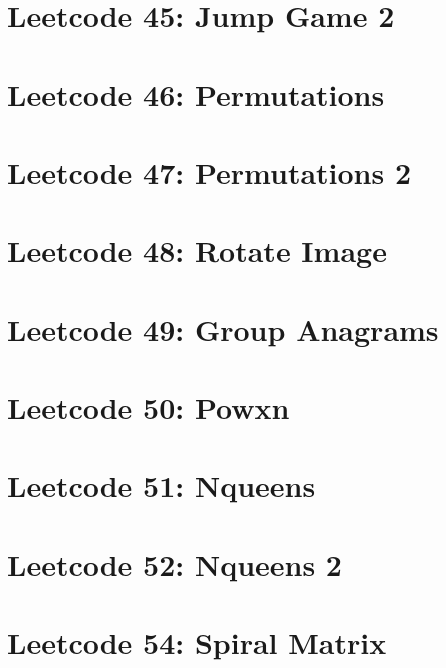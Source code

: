 \documentclass{article}
\begin{document}
\section*{Leetcode 45: Jump Game 2}

\pagebreak 

\section*{Leetcode 46: Permutations}

\pagebreak 

\section*{Leetcode 47: Permutations 2}

\pagebreak 

\section*{Leetcode 48: Rotate Image}

\pagebreak 

\section*{Leetcode 49: Group Anagrams}

\pagebreak 

\section*{Leetcode 50: Powxn}

\pagebreak 

\section*{Leetcode 51: Nqueens}

\pagebreak 

\section*{Leetcode 52: Nqueens 2}

\pagebreak 

\section*{Leetcode 54: Spiral Matrix}

\pagebreak 
\end{document}
